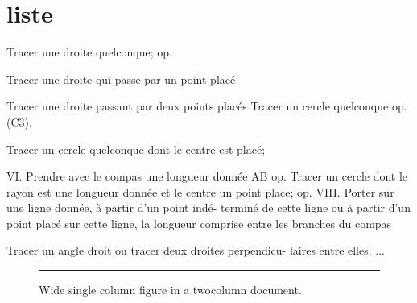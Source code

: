 \documentclass[12pt,a4paper,twocolumn]{book} %
\begin{document}


\onecolumn
\section{liste}

\begin{turn}{45}
  \begin{minipage}{\linewidth}
    Tracer une droite quelconque; op.

Tracer une droite qui passe par un point placé

Tracer une droite passant par deux points placés
Tracer un cercle quelconque op. (C3).

Tracer un cercle quelconque dont le centre est placé;

VI. Prendre avec le compas une longueur donnée AB
op.
Tracer un cercle dont le rayon est une longueur donnée
et le centre un point place; op.
VIII. Porter sur une ligne donnée, à partir d'un point indé-
terminé de cette ligne ou à partir d'un point placé
sur cette ligne, la longueur comprise entre les branches du compas

Tracer un angle droit ou tracer deux droites perpendicu-
laires entre elles.
...

  \end{minipage}

\end{turn}
\begin{figure}[ht]
\centering
\rule{\linewidth}{3cm}
\caption{Wide single column figure in a twocolumn document.}
\end{figure}
\end{document}
